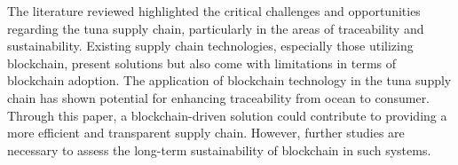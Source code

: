 The literature reviewed highlighted the critical challenges and opportunities regarding the tuna supply chain, particularly in the areas of traceability and sustainability. Existing supply chain technologies, especially those utilizing blockchain, present solutions but also come with limitations in terms of blockchain adoption. The application of blockchain technology in the tuna supply chain has shown potential for enhancing traceability from ocean to consumer. \\[1em]
Through this paper, a blockchain-driven solution could contribute to providing a more efficient and transparent supply chain. However, further studies are necessary to assess the long-term sustainability of blockchain in such systems.

















